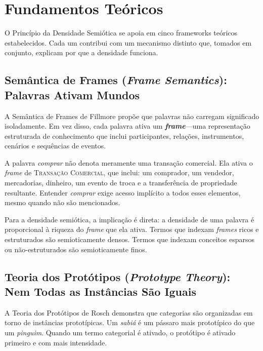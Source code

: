 \documentclass[12pt,a4paper]{article}
\begin{document}
\section{Fundamentos Teóricos}
\label{sec:theory}

O Princípio da Densidade Semiótica se apoia em cinco frameworks teóricos estabelecidos.
Cada um contribui com um mecanismo distinto que, tomados em conjunto, explicam por que a densidade funciona.

\subsection{Semântica de Frames (\textit{Frame Semantics}): Palavras Ativam Mundos}
\label{subsec:frames}

A Semântica de Frames de Fillmore \cite{fillmore1982} propõe que palavras não carregam significado isoladamente.
Em vez disso, cada palavra ativa um \textbf{\textit{frame}}---uma representação estruturada de conhecimento que inclui participantes, relações, instrumentos, cenários e sequências de eventos.

A palavra \textit{comprar} não denota meramente uma transação comercial.
Ela ativa o \textit{frame} de \textsc{Transação Comercial}, que inclui: um comprador, um vendedor, mercadorias, dinheiro, um evento de troca e a transferência de propriedade resultante.
Entender \textit{comprar} exige acesso implícito a todos esses elementos, mesmo quando não são mencionados.

Para a densidade semiótica, a implicação é direta: a densidade de uma palavra é proporcional à riqueza do \textit{frame} que ela ativa.
Termos que indexam \textit{frames} ricos e estruturados são semioticamente densos.
Termos que indexam conceitos esparsos ou não-estruturados são semioticamente finos.

\subsection{Teoria dos Protótipos (\textit{Prototype Theory}): Nem Todas as Instâncias São Iguais}
\label{subsec:prototypes}

A Teoria dos Protótipos de Rosch \cite{rosch1975} demonstra que categorias são organizadas em torno de instâncias prototípicas.
Um \textit{sabiá} é um pássaro mais prototípico do que um \textit{pinguim}.
Quando um termo categorial é ativado, o protótipo é ativado primeiro e com mais intensidade.
\end{document}
